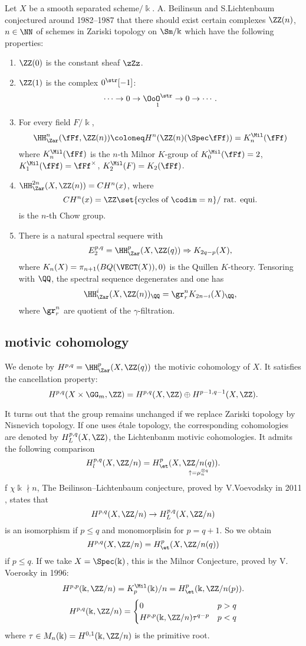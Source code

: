 Let $X$ be a smooth separated scheme$/\Bbbk$. A. Beilinsun and S.Lichtenbaum conjectured around 1982--1987 that there should exist certain complexes $\ZZ(n)$, $n \in \NN$ of
schemes in Zariski topology on $\Sm /\Bbbk$ which have the following properties:
\begin{enumerate}
	\item
			$\ZZ(0)$ is the constant sheaf $\zZz$.
	\item
			$\ZZ(1)$ is the complex $0^{\str}[-1]$:
			\[
					\cdots\to 0\to \underset{1}{\OoO^{\str}}\to0\to\cdots.
			\]
	\item
			For every field $F / \Bbbk$,
			\[
					\HH_{\Zar}^n(\fFf, \ZZ(n)) \coloneq H^n(\ZZ(n)(\Spec \fFf)) = K_{n}^{\Mil}(\fFf)
			\]
			where $K_n^{\Mil}(\fFf)$ is the $n$-th Milnor $K$-group of $K_0^{\Mil}(\fFf)=2$,
			$K_1^{\Mil}(\fFf)=\fFf^{\times}$, $K_2^{\Mil}(F)=K_2(\fFf)$.
	\item
			$\HH_{\Zar}^{2 n}(X,
			\ZZ(n))=CH^n(x)$, where
			\[
					CH^n(x)=\ZZ\set{\text {cycles of }\codim=n} / \text { rat. equi.}
			\]
			is the $n$-th Chow group.
	\item
			There is a natural spectral sequere with
			\[
					E_2^{p, q} = \HH_{\Zar}^p(X,\ZZ(q))\Rightarrow K_{2q-p}(X),
			\]
			where $K_n(X)=\pi_{n+1}(B Q(\VECT(X)), 0)$ is the Quillen $K$-theory. Tensoring with
			$\QQ$, the spectral sequence degenerates and one has $$ \HH_{\Zar}^i(X,
			\ZZ(n))_{\QQ}=\gr_r^n K_ {2 n-i}(X)_{\QQ}, $$ where $\gr_r^n$ are quotient of the
			$\gamma$-filtration.
\end{enumerate}

\subsection{motivic cohomology}

We denote by $H^{p,q}=\HH_{\Zar}^p(X, \ZZ(q))$ the motivic cohomology of $X$. It
satisfies the cancellation property: $$ H^{p, q}(X \times \GG_{m}, \ZZ)=H^{p, q}(X, \ZZ)
\oplus H^{p-1, q-1}(X, \ZZ). $$

It turns out that the group remains unchanged if we replace Zariski topology by Nisnevich
topology. If one uses étale topology, the corresponding cohomologies are denoted by
$H_L^{p, q}(X, \ZZ)$, the Lichtenbanm motivic cohomologies. It admits the following
comparison
\[
		H_l^{p, q}(X, \ZZ/n)=H_{\et}^p(X, \underset{\uparrow=\mu_n^{\otimes q}}{\ZZ/n(q)}).
\]
f $\chi\Bbbk\nmid n$, The Beilinson--Lichtenbaum conjecture, proved by V.Voevodsky in
2011 , states that $$ H^{p, q}(X, \ZZ / n) \rightarrow H_L^{p, q}(X, \ZZ / n) $$ is an
isomorphism if $p \leq q$ and monomorplisin for $p=q+1$. So we obtain $$ H^{p, q}(X, \ZZ
/ n)=H_{\et}^p(X, \ZZ / n(q)) $$ if $p \leq q$. If we take $X=\Spec(\Bbbk)$, this is the
Milnor Conjecture, proved by V. Voerosky in 1996:
\[
		H^{p, p}(\Bbbk, \ZZ / n)=K_p^{\Mil}(\Bbbk) / n=H_{\et}^p(\Bbbk, \ZZ / n(p)).
\]
$$
H^{p, q}(\Bbbk, \ZZ / n)=
\begin{cases}
	0                                  & p>q \\
	H^{p, p}(\Bbbk, \ZZ / n)\tau^{q-p} & p<q
\end{cases}
$$
where $\tau \in M_n(\Bbbk)=H^{0, 1}(\Bbbk, \ZZ / n)$ is the primitive root.

